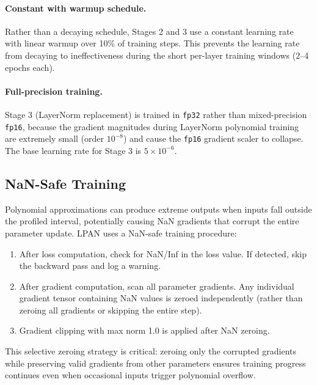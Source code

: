 \paragraph{Constant with warmup schedule.} Rather than a decaying schedule, Stages 2 and 3 use a constant learning rate with linear warmup over 10\% of training steps. This prevents the learning rate from decaying to ineffectiveness during the short per-layer training windows (2--4 epochs each).

\paragraph{Full-precision training.} Stage 3 (LayerNorm replacement) is trained in \texttt{fp32} rather than mixed-precision \texttt{fp16}, because the gradient magnitudes during LayerNorm polynomial training are extremely small (order $10^{-8}$) and cause the \texttt{fp16} gradient scaler to collapse. The base learning rate for Stage 3 is $5 \times 10^{-6}$.


\subsection{NaN-Safe Training}
\label{sec:nan_safe}

Polynomial approximations can produce extreme outputs when inputs fall outside the profiled interval, potentially causing NaN gradients that corrupt the entire parameter update. LPAN uses a NaN-safe training procedure:
\begin{enumerate}
    \item After loss computation, check for NaN/Inf in the loss value. If detected, skip the backward pass and log a warning.
    \item After gradient computation, scan all parameter gradients. Any individual gradient tensor containing NaN values is zeroed independently (rather than zeroing all gradients or skipping the entire step).
    \item Gradient clipping with max norm 1.0 is applied after NaN zeroing.
\end{enumerate}

This selective zeroing strategy is critical: zeroing only the corrupted gradients while preserving valid gradients from other parameters ensures training progress continues even when occasional inputs trigger polynomial overflow.



